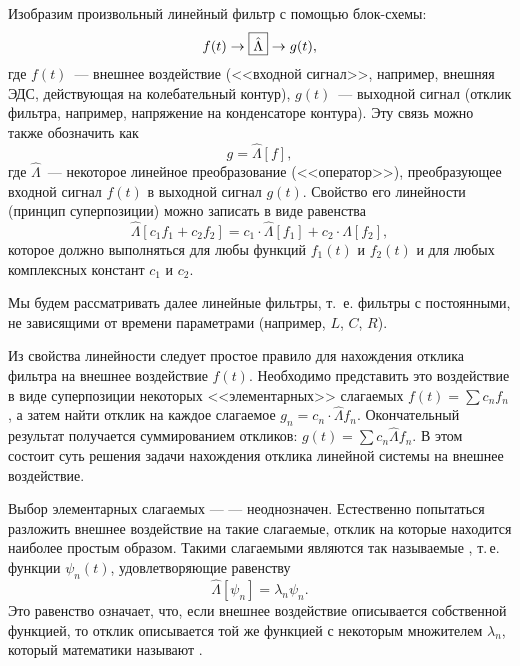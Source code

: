 Изобразим произвольный линейный фильтр с помощью блок-схемы:
\begin{equation*}
    f(t)\to\fbox{$\hat\Lambda$} \to g(t),
\end{equation*}
где $f(t)$~--- внешнее воздействие (<<входной сигнал>>, например, внешняя
ЭДС, действующая на колебательный контур), $g(t)$~--- выходной сигнал
(отклик фильтра, например, напряжение на конденсаторе контура).
Эту связь можно также обозначить как
\begin{equation*}
g=\hat\Lambda [f],
\end{equation*}
где $\hat\Lambda$~--- некоторое линейное преобразование (<<оператор>>),
преобразующее входной сигнал $f(t)$ в выходной сигнал $g(t)$.
Свойство его линейности (принцип суперпозиции) можно записать в
виде равенства
\begin{equation*}
\hat\Lambda [c_1f_1+c_2f_2]=c_1\cdot \hat \Lambda [f_1]+c_2\cdot \hat \Lambda [f_2],
\end{equation*}
которое должно выполняться для любы функций $f_1(t)$ и $f_2(t)$ и
для любых комплексных констант $c_1$ и $c_2$.

Мы будем рассматривать далее линейные  фильтры, т.~е.
фильтры с постоянными, не зависящими от времени параметрами (например, $L$, $C$, $R$).

Из свойства линейности следует простое правило для нахождения
отклика фильтра на  внешнее воздействие $f(t)$.
Необходимо представить это воздействие в виде суперпозиции некоторых
<<элементарных>> слагаемых $f(t)=\sum c_n f_n$, а затем найти отклик на каждое
слагаемое $g_n = c_n \cdot \hat \Lambda f_n$. Окончательный результат
получается суммированием откликов: $g(t)=\sum c_n \hat\Lambda f_n$.
В этом состоит суть  решения задачи
нахождения отклика линейной системы на внешнее воздействие.

Выбор элементарных слагаемых ---  --- неоднозначен.
Естественно попытаться разложить внешнее воздействие на такие
слагаемые, отклик на которые находится наиболее простым образом. Такими
слагаемыми являются так называемые
, т.\,е. функции $\psi_n(t)$,
удовлетворяющие равенству
\begin{equation}
    \hat \Lambda[\psi_n]=\lambda_n \psi_n.
\end{equation}
Это равенство означает, что, если внешнее воздействие описывается собственной
функцией, то отклик описывается той же функцией с некоторым множителем
$\lambda_n$, который математики называют .

